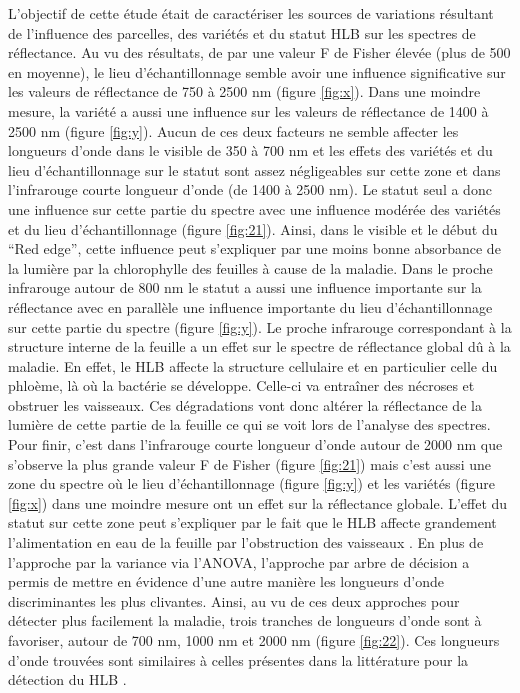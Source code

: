\documentclass[
  11pt,
  french,
  a4paper,
  extrafontsizes,onecolumn,openright
  ]{memoir}
\begin{document}
L'objectif de cette étude était de caractériser les sources de variations résultant de l'influence des parcelles, des variétés et du statut HLB sur les spectres de réflectance.
Au vu des résultats, de par une valeur F de Fisher élevée (plus de 500 en moyenne), le lieu d'échantillonnage semble avoir une influence significative sur les valeurs de réflectance de 750 à 2500 nm (figure \ref{fig:x}). Dans une moindre mesure, la variété a aussi une influence sur les valeurs de réflectance de 1400 à 2500 nm (figure \ref{fig:y}). Aucun de ces deux facteurs ne semble affecter les longueurs d'onde dans le visible de 350 à 700 nm et les effets des variétés et du lieu d'échantillonnage sur le statut sont assez négligeables sur cette zone et dans l'infrarouge courte longueur d'onde (de 1400 à 2500 nm).
Le statut seul a donc une influence sur cette partie du spectre avec une influence modérée des variétés et du lieu d'échantillonnage (figure \ref{fig:21}). Ainsi, dans le visible et le début du ``Red edge'', cette influence peut s'expliquer par une moins bonne absorbance de la lumière par la chlorophylle des feuilles à cause de la maladie.
Dans le proche infrarouge autour de 800 nm le statut a aussi une influence importante sur la réflectance avec en parallèle une influence importante du lieu d'échantillonnage sur cette partie du spectre (figure \ref{fig:y}).
Le proche infrarouge correspondant à la structure interne de la feuille a un effet sur le spectre de réflectance global dû à la maladie. En effet, le HLB affecte la structure cellulaire et en particulier celle du phloème, là où la bactérie se développe. Celle-ci va entraîner des nécroses et obstruer les vaisseaux. Ces dégradations vont donc altérer la réflectance de la lumière de cette partie de la feuille ce qui se voit lors de l'analyse des spectres.
Pour finir, c'est dans l'infrarouge courte longueur d'onde autour de 2000 nm que s'observe la plus grande valeur F de Fisher (figure \ref{fig:21}) mais c'est aussi une zone du spectre où le lieu d'échantillonnage (figure \ref{fig:y}) et les variétés (figure \ref{fig:x}) dans une moindre mesure ont un effet sur la réflectance globale. L'effet du statut sur cette zone peut s'expliquer par le fait que le HLB affecte grandement l'alimentation en eau de la feuille par l'obstruction des vaisseaux \autocite{bove_huanglongbing_2006}.
\vfill
\newpage
En plus de l'approche par la variance via l'ANOVA, l'approche par arbre de décision a permis de mettre en évidence d'une autre manière les longueurs d'onde discriminantes les plus clivantes. Ainsi, au vu de ces deux approches pour détecter plus facilement la maladie, trois tranches de longueurs d'onde sont à favoriser, autour de 700 nm, 1000 nm et 2000 nm (figure \ref{fig:22}). Ces longueurs d'onde trouvées sont similaires à celles présentes dans la littérature pour la détection du HLB \autocite{mishra_spectral_2007}.
\end{document}
